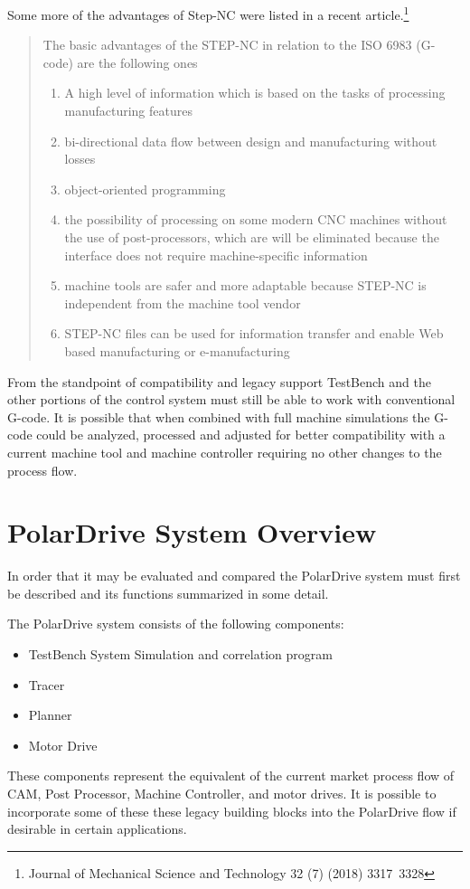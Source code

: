 \documentclass{article}
\begin{document}
\par 
Some more of the advantages of Step-NC were listed in a recent article.\footnote{Journal of Mechanical Science and Technology 32 (7) (2018) 3317~3328}
\begin{quote}
The basic advantages of the STEP-NC in relation to the ISO 6983 (G-code) are the following ones 
\begin{enumerate}
\item A high level of information which is based on the tasks of processing manufacturing features 
\item bi-directional data flow between design and manufacturing without losses
\item object-oriented programming
\item the possibility of processing on some modern CNC machines without the use of post-processors, which are will be eliminated because the interface does not require machine-specific information
\item machine tools are safer and more adaptable
because STEP-NC is independent from the machine tool vendor
\item STEP-NC files can be used for information transfer and enable Web based manufacturing or e-manufacturing
\end{enumerate}
\end{quote}
\par
From the standpoint of compatibility and legacy support TestBench and the other portions of the control system must still be able to work with conventional G-code. It is possible that when combined with full machine simulations the G-code could be analyzed, processed and adjusted for better compatibility with a current machine tool and machine controller requiring no other changes to the process flow. 

\section{PolarDrive System Overview}
In order that it may be evaluated and compared the PolarDrive system must first be described and its functions summarized in some detail. 
\par
The PolarDrive system consists of the following components: 
\begin{itemize}
\item TestBench System Simulation and correlation program
\item Tracer
\item Planner
\item Motor Drive 
\end{itemize}
\par
These components represent the equivalent of the current market process flow of CAM, Post Processor, Machine Controller, and motor drives. It is possible to incorporate some of these these legacy building blocks into the PolarDrive flow if desirable in certain applications.  
\end{document}

